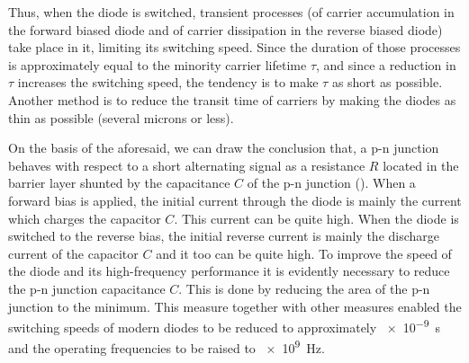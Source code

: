 Thus, when the diode is switched, transient processes (of carrier accumulation in the forward biased diode and of carrier dissipation in the reverse biased diode) take place in it, limiting its switching speed. Since the duration of those processes is approximately equal to the minority carrier lifetime $\tau$, and since a reduction in $\tau$ increases the switching speed, the tendency is to make $\tau$ as short as possible. Another method is to reduce the transit time of carriers by making the diodes as thin as possible (several microns or less).

On the basis of the aforesaid, we can draw the conclusion that, a p-n junction behaves with respect to a short alternating signal as a resistance $R$ located in the barrier layer shunted by the capacitance $C$ of the p-n junction (). When a forward bias is applied, the initial current through the diode is mainly the current which charges the capacitor $C$. This current can be quite high. When the diode is switched to the reverse bias, the initial reverse current is mainly the discharge current of the capacitor $C$ and it too can be quite high. To improve the speed of the diode and its high-frequency performance it is evidently necessary to reduce the p-n junction capacitance $C$. This is done by reducing the area of the p-n junction to the minimum. This measure together with other measures enabled the switching speeds of modern diodes to be reduced to approximately \SI{e-9}{\second} and the operating frequencies to be raised to \SI{e9}{\hertz}.

